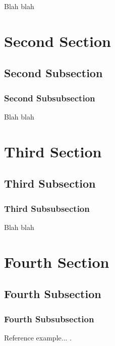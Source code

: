 \documentclass[11pt]{book}
\begin{document}
Blah blah

\section{Second Section}

\subsection{Second Subsection}

\subsubsection{Second Subsubsection}

Blah blah

\section{Third Section}

\subsection{Third Subsection}

\subsubsection{Third Subsubsection}

Blah blah

\section{Fourth Section}

\subsection{Fourth Subsection}

\subsubsection{Fourth Subsubsection}

Reference example... \cite{Tsa2006}.
\end{document}
